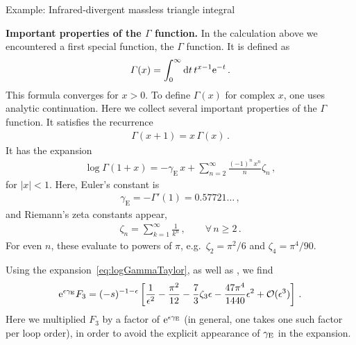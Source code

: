 \begin{example}{Example: Infrared-divergent massless triangle integral}
\begin{svgraybox}
{\bf Important properties of the $\Gamma$ function.}
In the calculation above we encountered a first special function, the $\Gamma$ function.
It is defined as 
\begin{align}
\Gamma(x) = \int_0^\infty \d t \, t^{x-1} \mathrm{e}^{-t} \,.
\end{align}
This formula converges for $x >0$. To define $\Gamma(x)$ for complex $x$, one uses analytic continuation.
Here we collect several important properties of the $\Gamma$ function.
%
It satisfies the recurrence
\begin{align} \label{eq:gammarecurrence}
\Gamma(x+1) = x \, \Gamma(x) \,.
\end{align}
It has the expansion
\begin{align} \label{eq:logGammaTaylor}
\log \Gamma(1+x) = - \gamma_{\text{E}} \, x + \sum_{n=2}^{\infty} \frac{(-1)^n \, x^n}{n} \zeta_n \,,
\end{align}
for $|x|<1$.
Here, Euler's constant is
\begin{align} \label{eq:EulerConstant}
\gamma_{\text{E}} = - \Gamma'(1) = 0.57721\ldots \,,
\end{align}
and Riemann's zeta constants appear,
\begin{align} \label{eq:zetan}
\zeta_n = \sum_{k=1}^{\infty} \frac{1}{k^n}  \,, \qquad \forall \, n\ge 2 \,.
\end{align}
For even $n$, these evaluate to powers of $\pi$, e.g.\ 
$\zeta_2 = \pi^2/6$ and $\zeta_{4} = \pi^4/90$.
\end{svgraybox}
Using the expansion~\eqref{eq:logGammaTaylor}, as well as , we find
\begin{align}
\mathrm{e}^{\epsilon \gamma_{\rm E}} F_{3} =  (-s)^{-1-\epsilon} \left[ \frac{1}{\epsilon^2} - \frac{\pi^2}{12} - \frac{7}{3} \zeta_3 \epsilon - \frac{47 \pi^4}{1440} \epsilon^2 + \mathcal{O}(\epsilon^3)\right]\,.
\end{align}
Here we multiplied $F_{3}$ by a factor of $\mathrm{e}^{\epsilon \gamma_{\rm E}}$ (in general, one takes one
such factor per loop order),
in order to avoid the explicit appearance of $\gamma_{\rm E}$ in the expansion.
\end{example}


